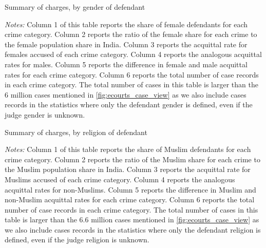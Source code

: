 \documentclass[12pt,english]{article}
\newcommand{\HOME}{\string~}
\newcommand{\curpath}{\HOME/ddl/justice-overleaf}
\newcommand{\curpath}{.}
\begin{document}
\begin{appendices}
\begin{landscape}
\begin{table}
      \begin{center}
        \caption{Summary of charges, by gender of defendant}
        \label{tab:summary_gender}
        \resizebox{1\linewidth}{!}{
        }
    \end{center}
     \begin{minipage}{1.4\textwidth}
    {\scriptsize \emph{Notes:} Column 1 of this table reports the share of female defendants for each crime category. Column 2 reports the ratio of the female share for each crime to the female population share in India. Column 3 reports the acquittal rate for females accused of each crime category. Column 4 reports the analogous acquittal rates for males. Column 5 reports the difference in female and male acquittal rates for each crime category. Column 6 reports the total number of case records in each crime category. The total number of cases in this table is larger than the 6 million cases mentioned in \ref{fig:ecourts_case_view} as we also include cases records in the statistics where only the defendant gender is defined, even if the judge gender is unknown.\par}
 \end{minipage}
\end{table}

\begin{table}
      \begin{center}
        \caption{Summary of charges, by religion of defendant}
        \label{tab:summary_religion}
        \resizebox{1\linewidth}{!}{
        }
      \end{center}
        \begin{minipage}{1.4\textwidth}
    {\scriptsize \emph{Notes:} Column 1 of this table reports the share of Muslim defendants for each crime category. Column 2 reports the ratio of the Muslim share for each crime to the Muslim population share in India. Column 3 reports the acquittal rate for Muslims accused of each crime category. Column 4 reports the analogous acquittal rates for non-Muslims. Column 5 reports the difference in Muslim and non-Muslim acquittal rates for each crime category. Column 6 reports the total number of case records in each crime category. The total number of cases in this table is larger than the 6.6 million cases mentioned in \ref{fig:ecourts_case_view} as we also include cases records in the statistics where only the defendant religion is defined, even if the judge religion is unknown.\par}
 \end{minipage}
\end{table}


\end{landscape}
\end{appendices}
\end{document}
